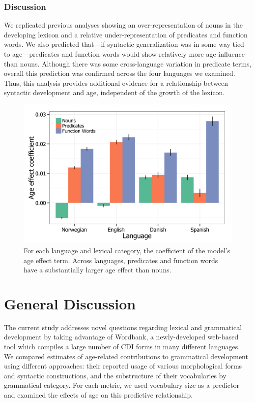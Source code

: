 \documentclass[10pt,letterpaper]{article}
\begin{document}
\subsubsection{Discussion}

We replicated previous analyses \cite{bates1994} showing an over-representation of nouns in the developing lexicon and a relative under-representation of predicates and function words. We also predicted that---if syntactic generalization was in some way tied to age---predicates and function words would show relatively more age influence than nouns. Although there was some cross-language variation in predicate terms, overall this prediction was confirmed across the four languages we examined. Thus, this analysis provides additional evidence for a relationship between syntactic development and age, independent of the growth of the lexicon.

\begin{figure}
\centering
\includegraphics[width=\linewidth]{plots/coefs_vocab_comp.png}
\caption{\label{fig:coefs_vocab_comp} For each language and lexical category, the coefficient of the model's age effect term. Across languages, predicates and function words have a substantially larger age effect than nouns.}
\end{figure}

\section{General Discussion}

The current study addresses novel questions regarding lexical and grammatical development by taking advantage of Wordbank, a newly-developed web-based tool which compiles a large number of CDI forms in many different languages.  We compared estimates of age-related contributions to grammatical development using different approaches: their reported usage of various morphological forms and syntactic constructions, and the substructure of their vocabularies by grammatical category. For each metric, we used vocabulary size as a predictor and examined the effects of age on this predictive relationship.
\end{document}
